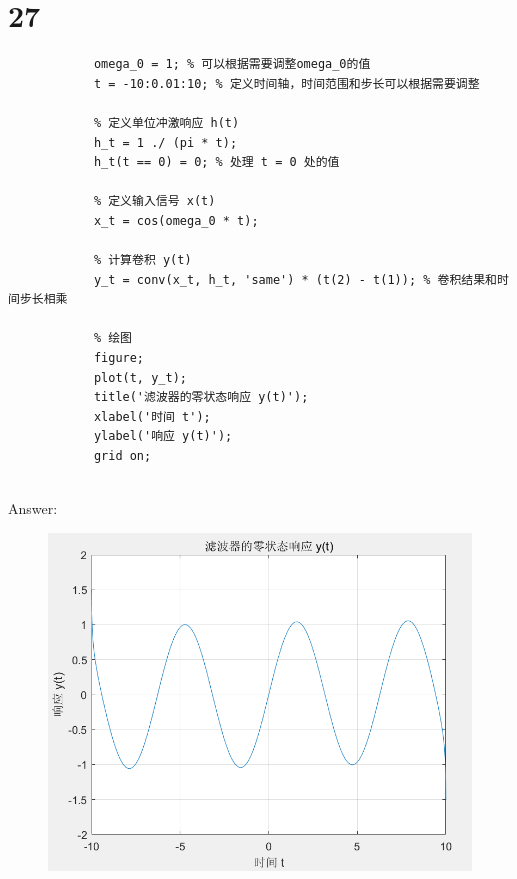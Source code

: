 \documentclass{article}
\begin{document}
    \section*{27}
        \begin{lstlisting}[caption={题27 MATLAB代码}, label={lst:matlab}]
            % 参数定义
            omega_0 = 1; % 可以根据需要调整omega_0的值
            t = -10:0.01:10; % 定义时间轴，时间范围和步长可以根据需要调整

            % 定义单位冲激响应 h(t)
            h_t = 1 ./ (pi * t);
            h_t(t == 0) = 0; % 处理 t = 0 处的值

            % 定义输入信号 x(t)
            x_t = cos(omega_0 * t);

            % 计算卷积 y(t)
            y_t = conv(x_t, h_t, 'same') * (t(2) - t(1)); % 卷积结果和时间步长相乘

            % 绘图
            figure;
            plot(t, y_t);
            title('滤波器的零状态响应 y(t)');
            xlabel('时间 t');
            ylabel('响应 y(t)');
            grid on;


        \end{lstlisting}
        Answer:
            \begin{figure}[h]
                \includegraphics[scale=0.6]{27.png}
            \end{figure}
            \FloatBarrier
            
    
\end{document}
